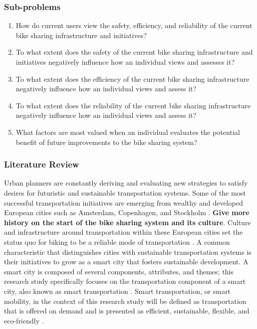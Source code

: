 \documentclass[12pt]{article}
\begin{document}
\subsubsection*{Sub-problems}
\begin{enumerate}
    \item How do current users view the safety, efficiency, and reliability of the current bike sharing infrastructure and initiatives?
    \item To what extent does the safety of the current bike sharing infrastructure and initiatives negatively influence how an
    individual views and assesses it?
    \item To what extent does the efficiency of the current bike sharing infrastructure negatively influence how an
    individual views and assess it?
    \item To what extent does the reliability of the current bike sharing infrastructure negatively influence how an
    individual views and assess it?
    \item What factors are most valued when an individual evaluates the potential benefit of future improvements to the bike sharing system?
\end{enumerate}
\medskip
\subsubsection*{Literature Review}
Urban planners are constantly deriving and evaluating new strategies to satisfy desires for futuristic and sustainable 
transportation systems. Some of the most successful transportation initiatives are emerging from wealthy and developed 
European cities such as Amsterdam, Copenhagen, and Stockholm \cite{DeliotteReport}. \textbf{Give more history on the start of the bike sharing system and its culture}. Culture and infrastructure around transportation 
within these European cities set the status quo for biking to be a reliable mode of transportation \cite{DeliotteReport}.  A common characteristic 
that distinguishes cities with sustainable transportation systems is their initiatives to grow as a smart city that 
fosters sustainable development. A smart city is composed of several components, attributes, and themes; this research study 
specifically focuses on the transportation component of a smart city, also known as smart transportation \cite{DefiningSmartCity}. 
Smart transportation, or smart mobility, in the context of this research study will be defined as transportation that is offered on demand
and is presented as efficient, sustainable, flexible, and eco-friendly \cite{SmartTransportation}. 
\end{document}
